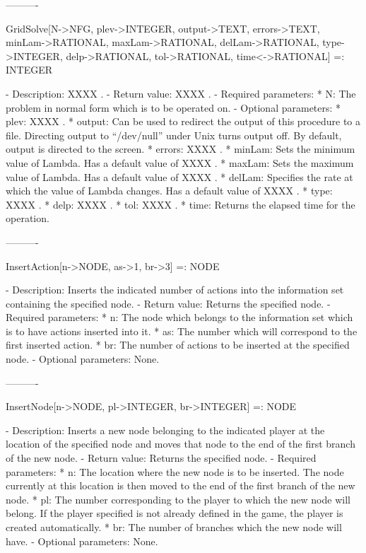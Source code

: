 ----------

GridSolve[N->NFG, {plev->INTEGER}, {output->TEXT}, {errors->TEXT},
	{minLam->RATIONAL}, {maxLam->RATIONAL}, {delLam->RATIONAL}, 
	{type->INTEGER}, {delp->RATIONAL}, {tol->RATIONAL}, {time<->RATIONAL}]
	 =: INTEGER

   -	Description:  XXXX .
   -	Return value:  XXXX .
   -	Required parameters:
	  *  N:  The problem in normal form which is to be operated on.
   -	Optional parameters:
	  *  plev:  XXXX .
	  *  output:  Can be used to redirect the output of this procedure to a
		file.  Directing output to ``/dev/null'' under Unix turns 
		output off.  By default, output is directed to the screen.
	  *  errors:  XXXX .
	  *  minLam:  Sets the minimum value of Lambda.  Has a default value of
		XXXX .
	  *  maxLam:  Sets the maximum value of Lambda.  Has a default value of
		XXXX .
	  *  delLam:  Specifies the rate at which the value of Lambda changes.
		Has a default value of XXXX .
	  *  type:  XXXX .
	  *  delp:  XXXX .
	  *  tol:  XXXX .
	  *  time:  Returns the elapsed time for the operation.

----------

InsertAction[n->NODE, as->1, br->3] =: NODE

   -	Description:  Inserts the indicated number of actions into the 
	information set containing the specified node.
   -	Return value:  Returns the specified node.
   -	Required parameters:
	  *  n:  The node which belongs to the information set which is to have
		actions inserted into it.
	  *  as:  The number which will correspond to the first inserted
		action.
	  *  br:  The number of actions to be inserted at the specified node.
   -	Optional parameters:  None.

----------

InsertNode[n->NODE, pl->INTEGER, br->INTEGER] =: NODE

   -	Description:  Inserts a new node belonging to the indicated player at 
	the location of the specified node and moves that node to the end of 
	the first branch of the new node.
   -	Return value:  Returns the specified node.
   -	Required parameters:
	  *  n:  The location where the new node is to be inserted.  The node
		currently at this location is then moved to the end of the 
		first branch of the new node.
	  *  pl:  The number corresponding to the player to which the new node
		will belong.  If the player specified is not already defined in
		the game, the player is created automatically.
	  *  br:  The number of branches which the new node will have.
   -	Optional parameters:  None.

